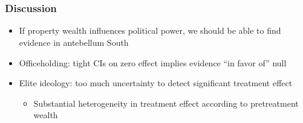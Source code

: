 \documentclass{beamer}
\begin{document}
\section[Discussion]{}

\begin{frame}
\frametitle{Discussion}
\begin{itemize}
\item If property wealth influences political power, we should be able to find evidence in antebellum South
\item Officeholding: tight CIs on zero effect implies evidence ``in favor of'' null
\item Elite ideology: too much uncertainty to detect significant treatment effect
\begin{itemize}
\item Substantial heterogeneity in treatment effect according to pretreatment wealth
\end{itemize}
\end{itemize}
\end{frame}

\section[References]{}

\begin{frame}
\begin{singlespace}
\begin{tiny}


\end{tiny}
\end{singlespace}
\itemize
\end{frame}

		
\end{document}
